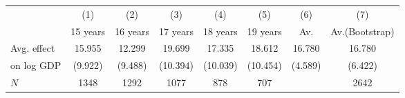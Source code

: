 \begin{tabular}{l*{7}{c}}
\hline\hline
            &\multicolumn{1}{c}{(1)}&\multicolumn{1}{c}{(2)}&\multicolumn{1}{c}{(3)}&\multicolumn{1}{c}{(4)}&\multicolumn{1}{c}{(5)}&\multicolumn{1}{c}{(6)}&\multicolumn{1}{c}{(7)}\\
            &    15 years&    16 years&    17 years&    18 years&    19 years&         Av.&Av.(Bootstrap)\\
\hline
Avg. effect &      15.955&      12.299&      19.699&      17.335&      18.612&      16.780&      16.780\\
on log GDP  &     (9.922)&     (9.488)&    (10.394)&    (10.039)&    (10.454)&     (4.589)&     (6.422)\\
\hline
\(N\)       &        1348&        1292&        1077&         878&         707&            &        2642\\
\hline\hline
\end{tabular}
